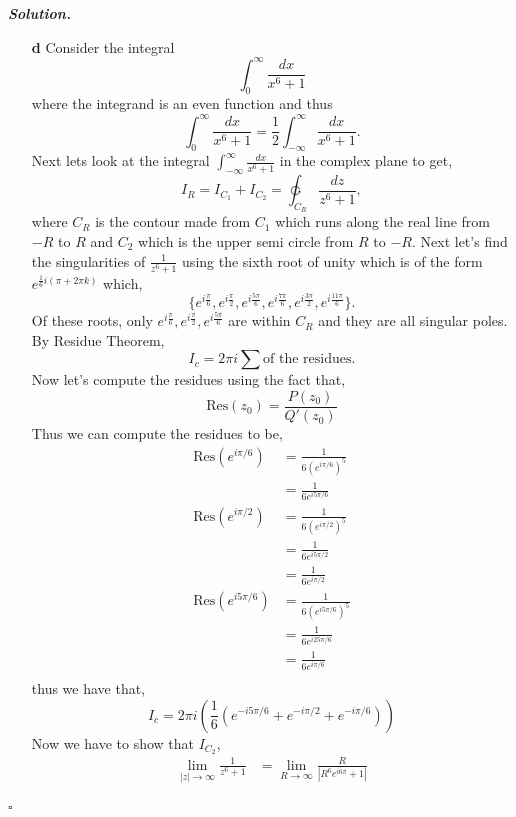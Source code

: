 \documentclass[12pt]{report}
\newenvironment{solution}[1][\it{Solution}]{\textbf{#1. } }{$\square$}
\def\ointcc{{\ointctrclockwise}}
\begin{document}
\begin{solution}
\begin{enumerate}
        \item [\bf{d}]
        Consider the integral 
        \[ \int_0^\infty \frac{dx}{x^6 + 1}\]
        where the integrand is an even function and thus
        \[ \int_0^\infty \frac{dx}{x^6 + 1} = \frac{1}{2}\int_{-\infty}^\infty \frac{dx}{x^6 + 1}.\] 
        Next lets look at the integral $\int_{-\infty}^\infty \frac{dx}{x^6 + 1}$ in the complex plane to get,
        \[ 
            I_R = I_{C_1} + I_{C_2} = \ointcc_{C_R} \frac{dz}{z^6 + 1},
        \]
        where $C_R$ is the contour made from $C_1$ which runs along the real line from $-R$ to $R$ and $C_2$ which is the upper semi circle from $R$ to $-R$. Next let's find the singularities of $\frac{1}{z^6 + 1}$ using the sixth root of unity which is of the form $e^{\frac{1}{6}i(\pi + 2\pi k)}$ which,
        \[ \{ e^{i\frac{\pi}{6}},e^{i\frac{\pi}{2}},e^{i\frac{5\pi}{6}}, e^{i\frac{7\pi}{6}},e^{i\frac{3\pi}{2}},e^{i\frac{11\pi}{6}}\}. \]
        Of these roots, only $e^{i\frac{\pi}{6}},e^{i\frac{\pi}{2}},e^{i\frac{5\pi}{6}}$ are within $C_R$ and they are all singular poles. By Residue Theorem,
        \[ 
            I_c = 2\pi i \sum \text{of the residues.}
        \]
        Now let's compute the residues using the fact that,
        \[ 
            \text{Res}(z_0) = \frac{P(z_0)}{Q'(z_0)}
        \]
        Thus we can compute the residues to be,
        \begin{align*}
            \text{Res}(e^{i\pi/6}) &= \frac{1}{6(e^{i\pi/6})^5}\\
            &= \frac{1}{6e^{i5\pi/6}}\\
            \text{Res}(e^{i\pi/2}) &= \frac{1}{6(e^{i\pi/2})^5}\\
            &= \frac{1}{6e^{i5\pi/2}}\\
            &= \frac{1}{6e^{i\pi/2}}\\
            \text{Res}(e^{i5\pi/6}) &= \frac{1}{6(e^{i5\pi/6})^5}\\
            &= \frac{1}{6e^{i25\pi/6}}\\
            &= \frac{1}{6e^{i\pi/6}}\\
        \end{align*}
        thus we have that,
        \[
            I_c = 2\pi i \left( \frac{1}{6} \left( e^{-i5\pi/6} + e^{-i\pi/2} + e^{-i\pi/6}\right) \right)
        \]
        Now we have to show that $I_{C_2}$,
        \begin{align*}
            \lim_{|z| \rightarrow \infty} \frac{1}{z^6 + 1} &= \lim_{R \rightarrow \infty} \frac{R}{\left|R^6e^{i6\pi} + 1\right|}\\

\end{align*}
\end{enumerate}
\end{solution}
\end{document}

